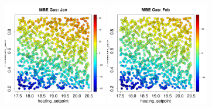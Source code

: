 \documentclass[a4paper, 12pt]{article}
\begin{document}
\newcommand{\scale}{12.2em}
\begin{figure}
\centering
 \includegraphics[width=\scale]{MBE/MBE_Gas_01.pdf}
 \includegraphics[width=\scale]{MBE/MBE_Gas_02.pdf}

\end{figure}
\end{document}
